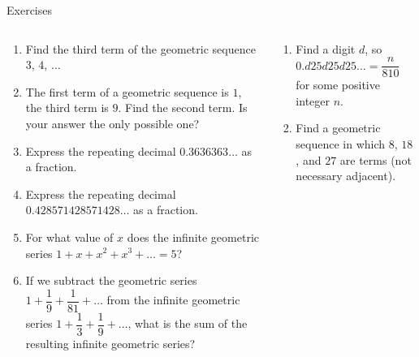 \documentclass[9pt,aspectratio=169]{beamer}
\begin{document}
\begin{frame}{Exercises}
  \begin{columns}[T]
    \begin{column}{0.5\textwidth}
      \begin{enumerate}
        \item Find the third term of the geometric sequence $3$, $4$, $\ldots$
        \item The first term of a geometric sequence is $1$, the third term is $9$. Find the second term. Is your answer the only possible one?
        \item Express the repeating decimal $0.3636363\ldots$ as a fraction.
        \item Express the repeating decimal $0.428571428571428\ldots$ as a fraction.
        \item For what value of $x$ does the infinite geometric series $1 + x + x^2 + x^3 + \ldots = 5$?
        \item If we subtract the geometric series $1 + \dfrac{1}{9} + \dfrac{1}{81} + \ldots$ from the infinite geometric series $1 + \dfrac{1}{3} + \dfrac{1}{9} + \ldots$, what is the sum of the resulting infinite geometric series?
        \seti
      \end{enumerate}
    \end{column}
    \begin{column}{0.5\textwidth}
      \begin{enumerate}
        \conti
        \item Find a digit $d$, so $0.d25d25d25\ldots = \dfrac{n}{810}$ for some positive integer $n$.
        \item Find a geometric sequence in which $8$, $18$, and $27$ are terms (not necessary adjacent).
      \end{enumerate}
    \end{column}
  \end{columns}
\end{frame}
\end{document}
